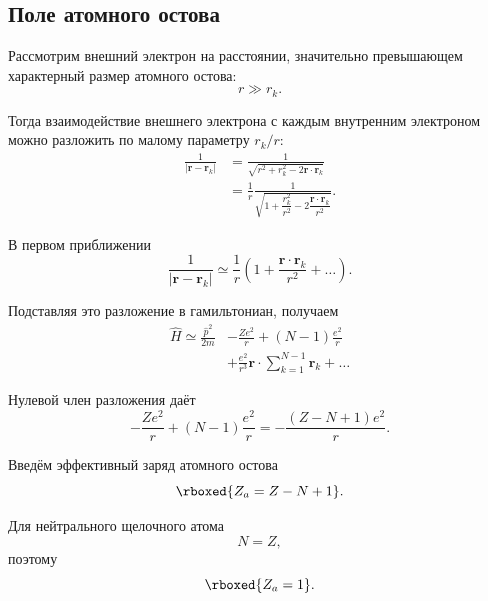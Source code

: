 \documentclass[../final.tex]{subfiles}
\begin{document}
\subsection{Поле атомного остова}

Рассмотрим внешний электрон на расстоянии, значительно превышающем
характерный размер атомного остова:
\begin{equation*}
    r\gg r_k.
\end{equation*}

Тогда взаимодействие внешнего электрона с каждым внутренним электроном
можно разложить по малому параметру \(r_k/r\):
\begin{align*}
    \frac{1}{|\mathbf r-\mathbf r_k|}
    &=
    \frac{1}
    {\sqrt{r^2+r_k^2-2\mathbf r\cdot\mathbf r_k}}
    \\
    &=
    \frac{1}{r}
    \frac{1}
    {\sqrt{
        1+\dfrac{r_k^2}{r^2}
        -2\dfrac{\mathbf r\cdot\mathbf r_k}{r^2}
    }}.
\end{align*}

В первом приближении
\begin{equation*}
    \frac{1}{|\mathbf r-\mathbf r_k|}
    \simeq
    \frac{1}{r}
    \left(
        1+
        \frac{\mathbf r\cdot\mathbf r_k}{r^2}
        +\ldots
    \right).
\end{equation*}

Подставляя это разложение в гамильтониан, получаем
\begin{align*}
    \hat H
    \simeq
    \frac{\hat p^2}{2m}
    &-
    \frac{Ze^2}{r}
    +
    (N-1)\frac{e^2}{r}
    \\
    &+
    \frac{e^2}{r^3}
    \mathbf r\cdot
    \sum_{k=1}^{N-1}\mathbf r_k
    +\ldots
\end{align*}

Нулевой член разложения даёт
\begin{equation*}
    -\frac{Ze^2}{r}
    +(N-1)\frac{e^2}{r}
    =
    -\frac{(Z-N+1)e^2}{r}.
\end{equation*}

Введём эффективный заряд атомного остова
\begin{equation*}
    \rboxed{
        Z_a=Z-N+1
    }.
\end{equation*}

Для нейтрального щелочного атома
\begin{equation*}
    N=Z,
\end{equation*}
поэтому
\begin{equation*}
    \rboxed{
        Z_a=1
    }.
\end{equation*}
\end{document}
